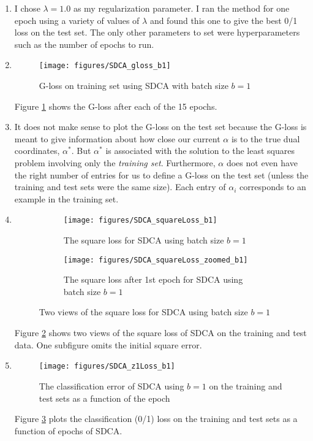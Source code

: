 \documentclass{article}
\begin{document}
\begin{enumerate}
	\item I chose $\lambda=1.0$ as my regularization parameter. I ran the method for one epoch using a variety of values of $\lambda$ and found this one to give the best 0/1 loss on the test set. The only other parameters to set were hyperparameters such as the number of epochs to run.

	\item
	\begin{figure}
		\centering
		\texttt{[image: figures/SDCA\_gloss\_b1]}
		\caption{G-loss on training set using SDCA with batch size $b=1$} 
		\label{fig:SDCA_gloss_b1}
	\end{figure}
	Figure \ref{fig:SDCA_gloss_b1} shows the G-loss after each of the 15 epochs.

	\item It does not make sense to plot the G-loss on the test set because the G-loss is meant to give information about how close our current $\alpha$ is to the true dual coordinates, $\alpha^*$. But $\alpha^*$ is associated with the solution to the least squares problem involving only the \emph{training set}. Furthermore, $\alpha$ does not even have the right number of entries for us to define a G-loss on the test set (unless the training and test sets were the same size). Each entry of $\alpha_i$ corresponds to an example in the training set.

	\item
	\begin{figure}
		\centering
		\begin{subfigure}{0.49\textwidth}
			\centering
			\texttt{[image: figures/SDCA\_squareLoss\_b1]}
			\caption{The square loss for SDCA using batch size $b=1$}
		\end{subfigure}
		\begin{subfigure}{0.49\textwidth}
			\centering
			\texttt{[image: figures/SDCA\_squareLoss\_zoomed\_b1]}
			\caption{The square loss after 1st epoch for SDCA using batch size $b=1$}
		\end{subfigure}
		\caption{Two views of the square loss for SDCA using batch size $b=1$} 
		\label{fig:SDCA_squareLoss_b1}
	\end{figure}
	Figure \ref{fig:SDCA_squareLoss_b1} shows two views of the square loss of SDCA on the training and test data. One subfigure omits the initial square error.

	\item
	\begin{figure}
		\centering
		\texttt{[image: figures/SDCA\_z1Loss\_b1]}
		\caption{The classification error of SDCA using $b=1$ on the training and test sets as a function of the epoch} 
		\label{fig:SDCA_z1Loss_b1}
	\end{figure}
	Figure \ref{fig:SDCA_z1Loss_b1} plots the classification (0/1) loss on the training and test sets as a function of epochs of SDCA.


\end{enumerate}
\end{document}
